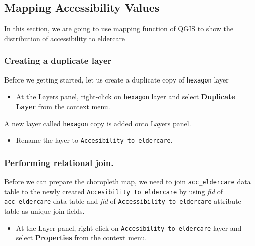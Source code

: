 \documentclass[
  letterpaper,
  DIV=11,
  numbers=noendperiod]{scrreprt}
\providecommand{\tightlist}{%
  \setlength{\itemsep}{0pt}\setlength{\parskip}{0pt}}\usepackage{longtable,booktabs,array}
\begin{document}
\hypertarget{mapping-accessibility-values}{%
\subsection{Mapping Accessibility
Values}\label{mapping-accessibility-values}}

In this section, we are going to use mapping function of QGIS to show
the distribution of accessibility to eldercare

\hypertarget{creating-a-duplicate-layer}{%
\subsubsection{Creating a duplicate
layer}\label{creating-a-duplicate-layer}}

Before we getting started, let us create a duplicate copy of
\texttt{hexagon} layer

\begin{itemize}
\tightlist
\item
  At the Layers panel, right-click on \texttt{hexagon} layer and select
  \textbf{Duplicate Layer} from the context menu.
\end{itemize}

A new layer called \texttt{hexagon} copy is added onto Layers panel.

\begin{itemize}
\tightlist
\item
  Rename the layer to \texttt{Accesibility\ to\ eldercare}.
\end{itemize}

\hypertarget{performing-relational-join.}{%
\subsubsection{Performing relational
join.}\label{performing-relational-join.}}

Before we can prepare the choropleth map, we need to join
\texttt{acc\_eldercare} data table to the newly created
\texttt{Accesibility\ to\ eldercare} by using \emph{fid} of
\texttt{acc\_eldercare} data table and \emph{fid} of
\texttt{Accessibility\ to\ eldercare} attribute table as unique join
fields.

\begin{itemize}
\tightlist
\item
  At the Layer panel, right-click on
  \texttt{Accesibility\ to\ eldercare} layer and select
  \textbf{Properties} from the context menu.
\end{itemize}
\end{document}
